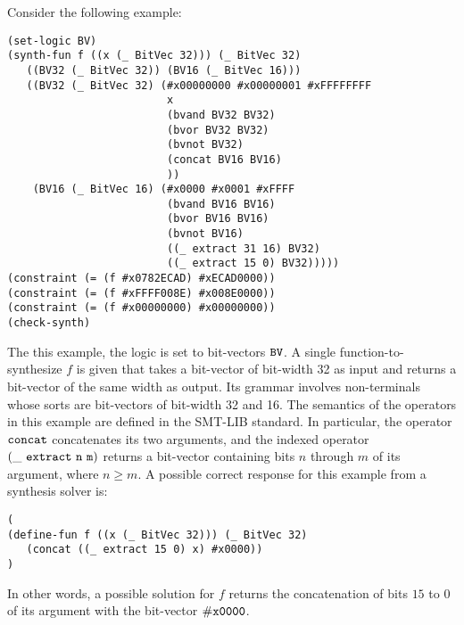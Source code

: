 \documentclass[english,a4paper,10pt]{article}
\begin{document}
\begin{example}
Consider the following example:
\begin{lstlisting}[language=SyGuS]
(set-logic BV)
(synth-fun f ((x (_ BitVec 32))) (_ BitVec 32)
   ((BV32 (_ BitVec 32)) (BV16 (_ BitVec 16)))
   ((BV32 (_ BitVec 32) (#x00000000 #x00000001 #xFFFFFFFF
                         x
                         (bvand BV32 BV32)
                         (bvor BV32 BV32)
                         (bvnot BV32)
                         (concat BV16 BV16)
                         ))
    (BV16 (_ BitVec 16) (#x0000 #x0001 #xFFFF
                         (bvand BV16 BV16)
                         (bvor BV16 BV16)
                         (bvnot BV16)
                         ((_ extract 31 16) BV32)
                         ((_ extract 15 0) BV32)))))
(constraint (= (f #x0782ECAD) #xECAD0000))
(constraint (= (f #xFFFF008E) #x008E0000))
(constraint (= (f #x00000000) #x00000000))
(check-synth)
\end{lstlisting}
The this example, the logic is set to bit-vectors ${\tt BV}$.
A single function-to-synthesize $f$ is given that takes a
bit-vector of bit-width 32 as input and returns a bit-vector of the same width as output.
Its grammar involves non-terminals whose sorts are bit-vectors of
bit-width 32 and 16.
The semantics of the operators in this example are defined in the SMT-LIB standard.
In particular,
the operator ${\tt concat}$ concatenates its two arguments,
and the indexed operator ${\tt (\_\ extract\ n\ m)}$
returns a bit-vector containing bits $n$ through $m$ of its
argument, where $n \geq m$.
A possible correct response for this example from a synthesis solver is:
\begin{lstlisting}[language=SyGuS]
(
(define-fun f ((x (_ BitVec 32))) (_ BitVec 32) 
   (concat ((_ extract 15 0) x) #x0000))
)
\end{lstlisting}
In other words, a possible solution for $f$ 
returns the concatenation of bits $15$ to $0$ of its argument
with the bit-vector ${\tt \#x0000}$.
\end{example}
\end{document}
